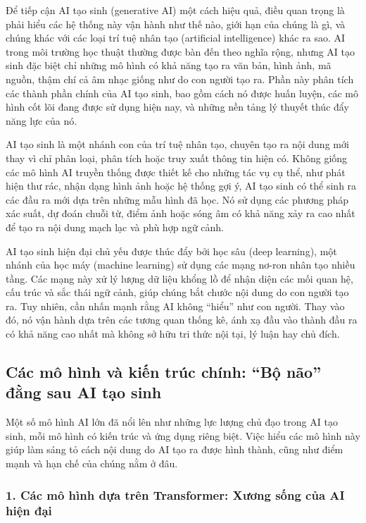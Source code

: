 Để tiếp cận AI tạo sinh (generative AI) một cách hiệu quả, điều quan trọng là phải hiểu các hệ thống này vận hành như thế nào, giới hạn của chúng là gì, và chúng khác với các loại trí tuệ nhân tạo (artificial intelligence) khác ra sao. AI trong môi trường học thuật thường được bàn đến theo nghĩa rộng, nhưng AI tạo sinh đặc biệt chỉ những mô hình có khả năng tạo ra văn bản, hình ảnh, mã nguồn, thậm chí cả âm nhạc giống như do con người tạo ra. Phần này phân tích các thành phần chính của AI tạo sinh, bao gồm cách nó được huấn luyện, các mô hình cốt lõi đang được sử dụng hiện nay, và những nền tảng lý thuyết thúc đẩy năng lực của nó.

AI tạo sinh là một nhánh con của trí tuệ nhân tạo, chuyên tạo ra nội dung mới thay vì chỉ phân loại, phân tích hoặc truy xuất thông tin hiện có. Không giống các mô hình AI truyền thống được thiết kế cho những tác vụ cụ thể, như phát hiện thư rác, nhận dạng hình ảnh hoặc hệ thống gợi ý, AI tạo sinh có thể sinh ra các đầu ra mới dựa trên những mẫu hình đã học. Nó sử dụng các phương pháp xác suất, dự đoán chuỗi từ, điểm ảnh hoặc sóng âm có khả năng xảy ra cao nhất để tạo ra nội dung mạch lạc và phù hợp ngữ cảnh.

AI tạo sinh hiện đại chủ yếu được thúc đẩy bởi học sâu (deep learning), một nhánh của học máy (machine learning) sử dụng các mạng nơ-ron nhân tạo nhiều tầng. Các mạng này xử lý lượng dữ liệu khổng lồ để nhận diện các mối quan hệ, cấu trúc và sắc thái ngữ cảnh, giúp chúng bắt chước nội dung do con người tạo ra. Tuy nhiên, cần nhấn mạnh rằng AI không ``hiểu'' như con người. Thay vào đó, nó vận hành dựa trên các tương quan thống kê, ánh xạ đầu vào thành đầu ra có khả năng cao nhất mà không sở hữu tri thức nội tại, lý luận hay chủ đích.

\subsection{Các mô hình và kiến trúc chính: ``Bộ não'' đằng sau AI tạo sinh}

Một số mô hình AI lớn đã nổi lên như những lực lượng chủ đạo trong AI tạo sinh, mỗi mô hình có kiến trúc và ứng dụng riêng biệt. Việc hiểu các mô hình này giúp làm sáng tỏ cách nội dung do AI tạo ra được hình thành, cũng như điểm mạnh và hạn chế của chúng nằm ở đâu.

\subsubsection{1. Các mô hình dựa trên Transformer: Xương sống của AI hiện đại}

